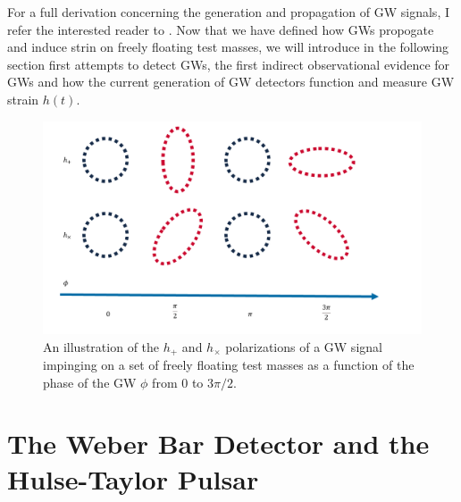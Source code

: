 For a full derivation concerning the generation and propagation of 
\ac{GW} signals, I refer 
the interested reader to \cite{Flanagan_2005}. Now that we have defined 
how \ac{GW}s propogate and induce strin on freely floating test masses, we 
will introduce in the following section first attempts to detect 
\ac{GW}s, the first indirect observational evidence for \ac{GW}s and 
how the current generation of \ac{GW} detectors function and measure 
\ac{GW} strain $h(t)$.

\begin{figure}
    \centering
    \includegraphics[width=\linewidth]{figures/GW_polarizations_thesis_figure.png}
    \caption[$h_+$ and $h_\times$ polarization illustration]{An illustration of the $h_+$ and $h_\times$ polarizations of a \ac{GW} signal impinging on a set of freely floating test masses as a function of the phase of the \ac{GW} $\phi$ from $0$ to $3\pi / 2$.}
    \label{fig:gw_plus_cross}
\end{figure}

\section{The Weber Bar Detector and the Hulse-Taylor Pulsar}

